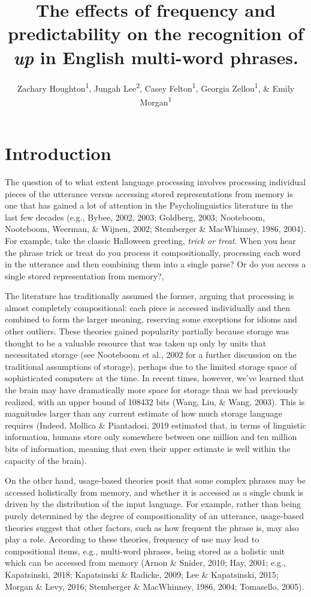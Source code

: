 \documentclass[
  man,floatsintext]{apa6}
\title{The effects of frequency and predictability on the recognition of \emph{up} in English multi-word phrases.}
\author{Zachary Houghton\textsuperscript{1}, Jungah Lee\textsuperscript{2}, Casey Felton\textsuperscript{1}, Georgia Zellou\textsuperscript{1}, \& Emily Morgan\textsuperscript{1}}
\date{}
\affiliation{\vspace{0.5cm}\textsuperscript{1} University of California, Davis\\\textsuperscript{2} Chosun University}
\begin{document}
\maketitle

\section{Introduction}\label{introduction}

The question of to what extent language processing involves processing individual pieces of the utterance versus accessing stored representations from memory is one that has gained a lot of attention in the Psycholinguistics literature in the last few decades (e.g., Bybee, 2002, 2003; Goldberg, 2003; Nooteboom, Nooteboom, Weerman, \& Wijnen, 2002; Stemberger \& MacWhinney, 1986, 2004). For example, take the classic Halloween greeting, \emph{trick or treat}. When you hear the phrase trick or treat do you process it compositionally, processing each word in the utterance and then combining them into a single parse? Or do you access a single stored representation from memory?,

The literature has traditionally assumed the former, arguing that processing is almost completely compositional: each piece is accessed individually and then combined to form the larger meaning, reserving some exceptions for idioms and other outliers. These theories gained popularity partially because storage was thought to be a valuable resource that was taken up only by units that necessitated storage (see Nooteboom et al., 2002 for a further discussion on the traditional assumptions of storage), perhaps due to the limited storage space of sophisticated computers at the time. In recent times, however, we've learned that the brain may have dramatically more space for storage than we had previously realized, with an upper bound of 108432 bits (Wang, Liu, \& Wang, 2003). This is magnitudes larger than any current estimate of how much storage language requires (Indeed, Mollica \& Piantadosi, 2019 estimated that, in terms of linguistic information, humans store only somewhere between one million and ten million bits of information, meaning that even their upper estimate is well within the capacity of the brain).

On the other hand, usage-based theories posit that some complex phrases may be accessed holistically from memory, and whether it is accessed as a single chunk is driven by the distribution of the input language. For example, rather than being purely determined by the degree of compositionality of an utterance, usage-based theories suggest that other factors, such as how frequent the phrase is, may also play a role. According to these theories, frequency of use may lead to compositional items, e.g., multi-word phrases, being stored as a holistic unit which can be accessed from memory (Arnon \& Snider, 2010; Hay, 2001; e.g., Kapatsinski, 2018; Kapatsinski \& Radicke, 2009; Lee \& Kapatsinski, 2015; Morgan \& Levy, 2016; Stemberger \& MacWhinney, 1986, 2004; Tomasello, 2005).
\end{document}
